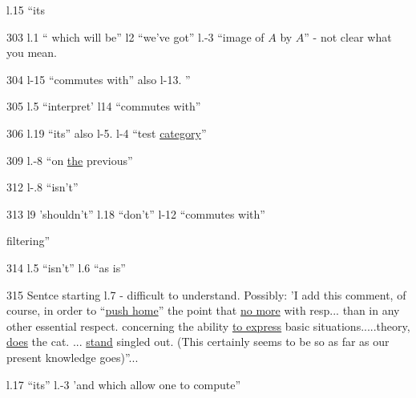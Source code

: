 \noindent{}%
 l.15 ``its

303 l.1 `` which will be'' l2 ``we've got'' l.-3 ``image of $A$ by $A$'' - not clear what you mean.

304 l-15 ``commutes with'' also l-13. ''

305 l.5 ``interpret' l14 ``commutes with''

306 l.19 ``its''  also l-5. l-4 ``test \uline{category}''

309 l.-8 ``on \uline{the} previous''

312 l-.8 ``isn't'' 

313 l9 'shouldn't'' l.18 ``don't'' l-12 ``commutes with''

  filtering''

314 l.5 ``isn't'' l.6 ``as is''

315 Sentce starting l.7 - difficult to understand. Possibly: 'I add this comment, of course,  in order to ``\uline{push home}'' the point that \uline{no more} with resp... than in any other essential respect. concerning the ability \uline{to express} basic situations.....theory, \uline{does} the cat. ... \uline{stand} singled out.  (This certainly seems to be so as far as our present knowledge goes)''...

l.17 ``its'' l.-3 'and which  allow one to compute''

